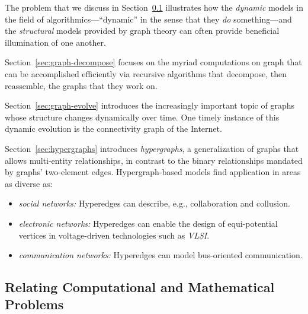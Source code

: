 The problem that we discuss in Section~\ref{sec:Relate-CS-Math-Probs}
illustrates how the {\em dynamic} models in the field of
algorithmics---``dynamic'' in the sense that they {\em do}
something---and the {\em structural} models provided by graph theory
can often provide beneficial illumination of one another.

Section~\ref{sec:graph-decompose} 
 focuses on the myriad computations
on graph that can be accomplished efficiently via recursive algorithms
that decompose, then reassemble, the graphs that they work on.

Section~\ref{sec:graph-evolve} 
introduces the increasingly important topic of graphs whose structure
changes dynamically over time.  One timely instance of this dynamic
evolution is the connectivity graph of the Internet.

Section~\ref{sec:hypergraphs} 
 introduces {\it hypergraphs}, a generalization of
graphs that allows multi-entity relationships, in contrast to the
binary relationships mandated by graphs' two-element edges.
Hypergraph-based models find application in areas as diverse as:
\begin{itemize}
\item
{\it social networks:} Hyperedges can describe, e.g., collaboration
and collusion.
\item
{\it electronic networks:} Hyperedges can enable the design of
equi-potential vertices in voltage-driven technologies such as {\it
  VLSI}.
\item
{\it communication networks:} Hyperedges can model bus-oriented
communication.
\end{itemize}




\subsection{Relating Computational and Mathematical Problems}
\label{sec:Relate-CS-Math-Probs}



